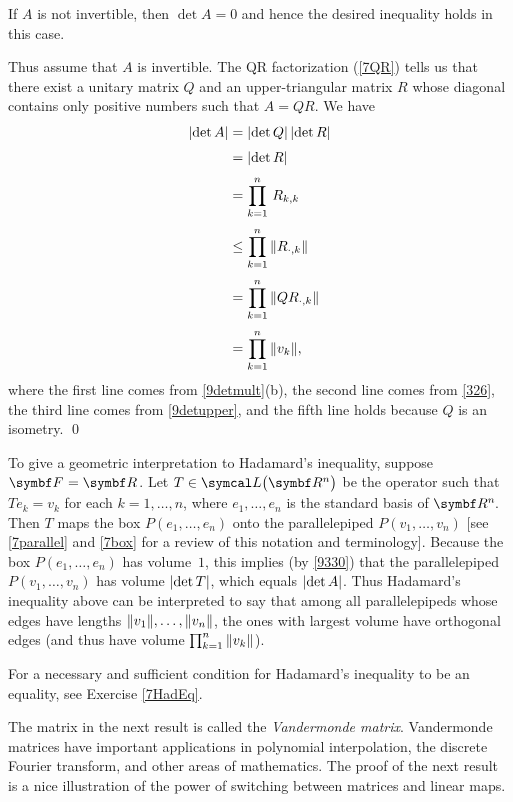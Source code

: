 \proof
If $A$ is not invertible, then $\det A = 0$ and hence the desired inequality holds in this case.

Thus assume that $A$ is invertible. The QR factorization (\ref{7QR}) tells us that there exist a unitary matrix $Q$ and an upper-triangular matrix $R$ whose diagonal contains only positive numbers such that $A = QR$. We have
\begin{align*}
\lvert \det A\rvert &= \lvert \det Q \rvert \, \lvert\det R\rvert \\[3bp]
&= \lvert \det R \rvert \\[3bp]
&= \prod_{k=1}^n \,  R_{k,k} \\[3bp]
&\le \prod_{k=1}^n \, \lVert R_{\cdot, k} \rVert \\[3bp]
&= \prod_{k=1}^n \, \lVert QR_{\cdot, k} \rVert \\[3bp]
&= \prod_{k=1}^n \, \lVert v_k\rVert,
\end{align*}
where the first line comes from \ref{9detmult}(b), the second line comes from \ref{326}, the third line comes from \ref{9detupper}, and the fifth line holds because $Q$ is an isometry.
\qed

To give a geometric interpretation to Hadamard's inequality, suppose \mbox{$\F{} = \R{}$}. Let $T \in \L\paren[\big]{\R n}$ be the operator such that $Te_k = v_k$ for each $k=1, \ldots, n$, where $e_1, \ldots, e_n$ is the standard basis of $\RR n$. Then $T$ maps the box $P(e_1, \ldots, e_n)$ onto the parallelepiped $P(v_1, \ldots, v_n)$ [see \ref{7parallel} and \ref{7box} for a review of this notation and terminology]. Because the box $P(e_1, \ldots, e_n)$ has volume~$1$, this implies (by \ref{9330}) that the parallelepiped $P(v_1, \ldots, v_n)$ has volume $\lvert\det T\rvert$, which equals $\lvert\det A\rvert$. Thus Hadamard's inequality above can be interpreted to say that among all parallelepipeds whose edges have lengths $\lVert v_1\rVert, \ldots, \lVert v_n\rVert$, the ones with largest volume have orthogonal edges \Big(and thus have volume $ \prod_{k=1}^n \, \lVert v_k \rVert$\Big).

For a necessary and sufficient condition for Hadamard's inequality to be an equality, see Exercise \ref{7HadEq}.

\pagebreak[3]

The matrix in the next result is called the \emph{Vandermonde matrix}. Vandermonde matrices have important applications in polynomial interpolation, the discrete Fourier transform, and other areas of mathematics.
The proof of the next result is a nice illustration of the power of switching between matrices and linear maps.

